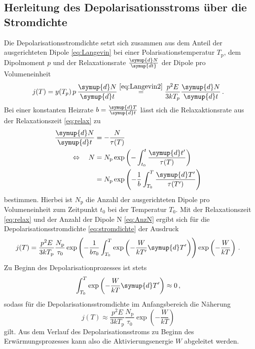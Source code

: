\subsection*{Herleitung des Depolarisationsstroms über die Stromdichte}
Die Depolarisationsstromdichte setzt sich zusammen aus dem Anteil der ausgerichteten Dipole \eqref{eq:Langevin} bei einer Polarisationstemperatur $T_\text{p}$, dem Dipolmoment $p$ und der Relaxationsrate $\frac{\symup{d}N}{\symup{dt}}$ der Dipole pro Volumeneinheit
\begin{equation}\label{eq:stromdichte}
    j(T)=y(T_p)\,p\,\frac{\symup{d}N}{\symup{d}t} \stackrel{\eqref{eq:Langevin2}}{=} \frac{p^2 E}{3kT_p}\frac{\symup{d}N}{\symup{d}t} \, .
\end{equation}
Bei einer konstanten Heizrate $b = \frac{\symup{d}T}{\symup{d}t}$ lässt sich die Relaxaktionsrate aus der Relaxationszeit \eqref{eq:relax} zu
\begin{align}
    \frac{\symup{d}N}{\symup{d}t} & = -\frac{N}{\tau(T)}\notag \\
    \Leftrightarrow \quad N & = N_\text{p}\exp\left(-\int_{t_0}^t \frac{\symup{d}t'}{\tau(T)}\right)\notag \\
    & = N_\text{p}\exp\left(-\frac{1}{b}\int_{T_0}^T \frac{\symup{d}T'}{\tau(T')}\right)\label{eq:AnzN}
\end{align}
bestimmen.
Hierbei ist $N_\text{p}$ die Anzahl der ausgerichteten Dipole pro Volumeneinheit zum Zeitpunkt $t_0$ bei der Temperatur $T_0$.
Mit der Relaxationszeit \eqref{eq:relax} und der Anzahl der Dipole N \eqref{eq:AnzN} ergibt sich für die Depolarisationsstromdichte \eqref{eq:stromdichte} der Ausdruck
\begin{equation}\label{eq:stromdichte2}
    j(T)= \frac{p^2E}{3kT_\text{p}}\frac{N_\text{p}}{\tau_0}\exp\left(-\frac{1}{b\tau_0}\int_{T_0}^T \exp\left(-\frac{W}{kT'}\symup{d}T'\right) \right)\exp\left(-\frac{W}{kT}\right)\, .
\end{equation}
Zu Beginn des Depolarisationprozesses ist stets
\begin{equation*}
    \int_{T_0}^T \exp\left(-\frac{W}{kT}\symup{d}T' \right) \approx 0\, ,
\end{equation*}
sodass für die Depolarisationsstromdichte im Anfangsbereich die Näherung
\begin{equation}
    j(T)\approx    \frac{p^2 E}{3kT_\text{p}}\frac{N_\text{p}}{\tau_0}\exp\left(-\frac{W}{kT}\right)
    \label{eq:anlauf}
\end{equation}
gilt.
Aus dem Verlauf des Depolarisationsstroms zu Beginn des Erwärmungsprozesses kann also die Aktivierungsenergie $W$ abgeleitet werden.


